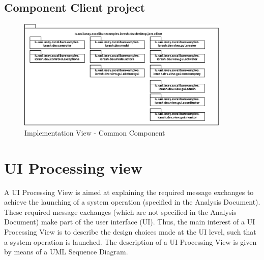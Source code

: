 \subsection{Component Client project}
\begin{figure}[h!]
	\centering
	\includegraphics[width=0.9\textwidth]{./images/architecture/implementation_view/client_project.eps}
	\caption{Implementation View - Common Component}
\end{figure}



\section{UI Processing view}
A \gls{UI Processing View} is aimed at explaining the required message exchanges
to achieve the launching of a system operation (specified in the \msrmessir
Analysis Document). These required message exchanges (which are not specified in
the \msrmessir Analysis Document) make part of the user interface (UI). Thus, the
main interest of a UI Processing View is to describe the design choices made
at the UI level, such that a system operation is launched. The description
of a UI Processing View is given by means of a UML Sequence Diagram. 



